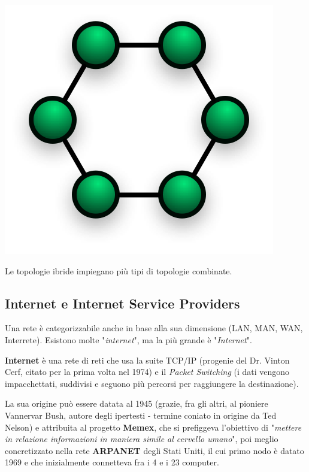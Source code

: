 \begin{itemize}
            \begin{center}
                \includegraphics[scale=0.25]{images/RingNetwork.png}
            \end{center}
        \end{itemize}
        
        Le topologie ibride impiegano più tipi di topologie combinate.
    
    \subsection{Internet e Internet Service Providers}
    
        Una rete è categorizzabile anche in base alla sua dimensione (LAN, MAN, WAN, Interrete). Esistono molte "\textit{internet}", ma la più grande è "\textit{Internet}".
    
        \textbf{Internet} è una rete di reti che usa la suite TCP/IP (progenie del Dr. Vinton Cerf, citato per la prima volta nel 1974) e il \textit{Packet Switching} (i dati vengono impacchettati, suddivisi e seguono più percorsi per raggiungere la destinazione). 
        
        \vspace{3mm}
        
        La sua origine può essere datata al 1945 (grazie, fra gli altri, al pioniere Vannervar Bush, autore degli ipertesti - termine coniato in origine da Ted Nelson) e attribuita al progetto \textbf{Memex}, che si prefiggeva l'obiettivo di "\textit{mettere in relazione informazioni in maniera simile al cervello umano}", poi meglio concretizzato nella rete \textbf{ARPANET} degli Stati Uniti, il cui primo nodo è datato 1969 e che inizialmente connetteva fra i 4 e i 23 computer.
        
